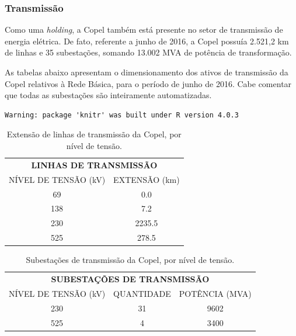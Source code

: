 \documentclass[grad,numbers]{coppe}
\begin{document}
  \hypertarget{transmissuxe3o}{%
  \subsubsection{Transmissão}\label{transmissuxe3o}}

  Como uma \emph{holding}, a Copel também está presente no setor de transmissão de energia elétrica. De fato, referente a junho de 2016, a Copel possuía 2.521,2 km de linhas e 35 subestações, somando 13.002 MVA de potência de transformação.

  As tabelas abaixo apresentam o dimensionamento dos ativos de transmissão da Copel relativos à Rede Básica, para o período de junho de 2016. Cabe comentar que todas as subestações são inteiramente automatizadas.
\begin{verbatim}
Warning: package 'knitr' was built under R version 4.0.3
\end{verbatim}
  \begin{table}[H]

  \caption{\label{tab:unnamed-chunk-2}Extensão de linhas de transmissão da Copel, por nível de tensão.}
  \centering
  \begin{tabular}[t]{cc}
  \toprule
  \multicolumn{2}{c}{\textbf{LINHAS DE TRANSMISSÃO}} \\
  \cmidrule(l{3pt}r{3pt}){1-2}
  NÍVEL DE TENSÃO (kV) & EXTENSÃO (km)\\
  \midrule
  69 & 0.0\\
  138 & 7.2\\
  230 & 2235.5\\
  525 & 278.5\\
  \bottomrule
  \end{tabular}
  \end{table}
  \begin{table}[H]

  \caption{\label{tab:unnamed-chunk-3}Subestações de transmissão da Copel, por nível de tensão.}
  \centering
  \begin{tabular}[t]{ccc}
  \toprule
  \multicolumn{3}{c}{\textbf{SUBESTAÇÕES DE TRANSMISSÃO}} \\
  \cmidrule(l{3pt}r{3pt}){1-3}
  NÍVEL DE TENSÃO (kV) & QUANTIDADE & POTÊNCIA (MVA)\\
  \midrule
  230 & 31 & 9602\\
  525 & 4 & 3400\\
  \bottomrule
  \end{tabular}
  \end{table}
  \(\,\)
\end{document}
